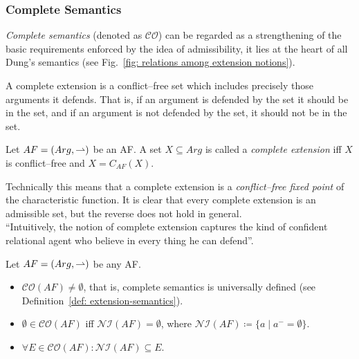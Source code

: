   




\subsubsection[Complete Semantics]{Complete Semantics }


\textit{Complete semantics} (denoted as {\color{purple} $\mathcal{CO}$}) can be regarded as a strengthening of the basic 
requirements enforced by the idea of admissibility, 
it lies at the heart of all Dung's semantics (see Fig.~\ref{fig: relations among extension notions}).


A complete extension is a conflict--free set which includes precisely those arguments it defends. 
That is, 
if an argument is defended by the set it should be in the set, 
and if an argument is not defended by the set, it should not be in the set.


\begin{df}
    Let $AF=(Arg,\rightharpoonup)$ be an AF. 
    A set $X \subseteq Arg$ is called a \textit{complete extension} iff $X$ is conflict--free and $X = C_{AF}(X)$. 
\end{df}


Technically this means that a complete extension is a \textit{conflict--free fixed point} of the characteristic function.
% 
It is clear that every complete extension is an admissible set, 
but the reverse does not hold in general. 
\\ 
``Intuitively, 
the notion of complete extension captures the kind of confident relational agent who believe in every thing he can defend''\cite{Dun1995}.



\begin{prop} Let $AF = (Arg,\rightharpoonup)$ be any AF.
    \begin{itemize}[itemsep=5pt,parsep=5pt,leftmargin=3em,topsep=5pt]
        \item $\mathcal{CO}(AF) \not= \emptyset$, 
        that is, 
        complete semantics is universally defined (see Definition~\ref{def: extension-semantics}).


        \item 
        $\emptyset \in \mathcal{CO}(AF)$ iff $\mathcal{NI}(AF) = \emptyset$, 
        where $\mathcal{NI}(AF) \coloneqq \{a \mid a^- = \emptyset\}$.

        
        \item 
        $\forall E \in \mathcal{CO}(AF): \mathcal{NI}(AF) \subseteq E$.
    \end{itemize}
\end{prop}






